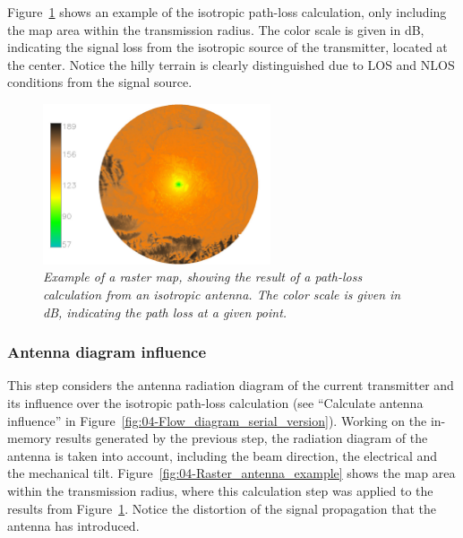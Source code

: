 Figure~\ref{fig:04-Raster_path_loss_example} shows an example of
the isotropic path-loss calculation, only including the map area within
the transmission radius. The color scale is given in dB, indicating
the signal loss from the isotropic source of the transmitter, located
at the center. Notice the hilly terrain is clearly distinguished due
to LOS and NLOS conditions from the signal source.

\begin{figure}
\centering

\includegraphics[width=0.6\textwidth]{04-framework_design_and_implementation/img/isotrophic_calculation}

\caption{\textit{\emph{Example of a raster map, showing the result of a path-loss
calculation from an isotropic antenna. The color scale is given in
dB, indicating the path loss at a given point. \label{fig:04-Raster_path_loss_example}}}}
\end{figure}



\subsubsection{Antenna diagram influence \label{sub:04-Antenna_diagram_influence}}

This step considers the antenna radiation diagram of the current transmitter
and its influence over the isotropic path-loss calculation (see ``Calculate
antenna influence'' in Figure~\ref{fig:04-Flow_diagram_serial_version}).
Working on the in-memory results generated by the previous step, the
radiation diagram of the antenna is taken into account, including
the beam direction, the electrical and the mechanical tilt. Figure~\ref{fig:04-Raster_antenna_example}
shows the map area within the transmission radius, where this calculation
step was applied to the results from Figure~\ref{fig:04-Raster_path_loss_example}.
Notice the distortion of the signal propagation that the antenna has
introduced.

